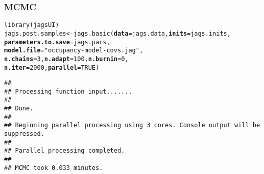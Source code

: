 \documentclass[color=usenames,dvipsnames]{beamer}\usepackage[]{graphicx}\usepackage[]{color}
\makeatletter
\newcommand{\hlnum}[1]{\textcolor[rgb]{0.69,0.494,0}{#1}}%
\newcommand{\hlstr}[1]{\textcolor[rgb]{0.749,0.012,0.012}{#1}}%
\newcommand{\hlstd}[1]{\textcolor[rgb]{0,0,0}{#1}}%
\newcommand{\hlkwb}[1]{\textcolor[rgb]{0,0.341,0.682}{#1}}%
\newcommand{\hlkwc}[1]{\textcolor[rgb]{0,0,0}{\textbf{#1}}}%
\newcommand{\hlkwd}[1]{\textcolor[rgb]{0.004,0.004,0.506}{#1}}%
\newenvironment{kframe}{%
 \def\at@end@of@kframe{}%
 \ifinner\ifhmode%
  \def\at@end@of@kframe{\end{minipage}}%
  \begin{minipage}{\columnwidth}%
 \fi\fi%
 \def\FrameCommand##1{\hskip\@totalleftmargin \hskip-\fboxsep
 \colorbox{shadecolor}{##1}\hskip-\fboxsep
     \hskip-\linewidth \hskip-\@totalleftmargin \hskip\columnwidth}%
 \MakeFramed {\advance\hsize-\width
   \@totalleftmargin\z@ \linewidth\hsize
   \@setminipage}}%
 {\par\unskip\endMakeFramed%
 \at@end@of@kframe}
\newenvironment{knitrout}{}{} %
\makeatother
\begin{document}
\begin{frame}[fragile]
  \frametitle{MCMC}
  \small
\begin{knitrout}\scriptsize
{}\color{fgcolor}\begin{kframe}
\begin{alltt}
\hlkwd{library}\hlstd{(jagsUI)}
\hlstd{jags.post.samples} \hlkwb{<-} \hlkwd{jags.basic}\hlstd{(}\hlkwc{data}\hlstd{=jags.data,} \hlkwc{inits}\hlstd{=jags.inits,}
                                \hlkwc{parameters.to.save}\hlstd{=jags.pars,}
                                \hlkwc{model.file}\hlstd{=}\hlstr{"occupancy-model-covs.jag"}\hlstd{,}
                                \hlkwc{n.chains}\hlstd{=}\hlnum{3}\hlstd{,} \hlkwc{n.adapt}\hlstd{=}\hlnum{100}\hlstd{,} \hlkwc{n.burnin}\hlstd{=}\hlnum{0}\hlstd{,}
                                \hlkwc{n.iter}\hlstd{=}\hlnum{2000}\hlstd{,} \hlkwc{parallel}\hlstd{=}\hlnum{TRUE}\hlstd{)}
\end{alltt}
\begin{verbatim}
## 
## Processing function input....... 
## 
## Done. 
##  
## Beginning parallel processing using 3 cores. Console output will be suppressed.
## 
## Parallel processing completed.
## 
## MCMC took 0.033 minutes.
\end{verbatim}
\end{kframe}
\end{knitrout}
\end{frame}
\end{document}
